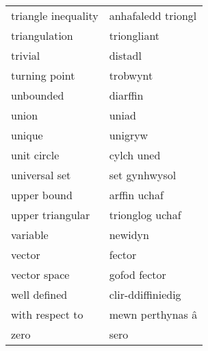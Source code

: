 \begin{supertabular}{p{0.22\textwidth}p{0.22\textwidth}}
              triangle inequality &               anhafaledd triongl \\
                    triangulation &                      triongliant \\
                          trivial &                          distadl \\
                    turning point &                         trobwynt \\
                        unbounded &                         diarffin \\
                            union &                            uniad \\
                           unique &                          unigryw \\
                      unit circle &                       cylch uned \\
                    universal set &                    set gynhwysol \\
                      upper bound &                     arffin uchaf \\
                 upper triangular &                  trionglog uchaf \\
                         variable &                          newidyn \\
                           vector &                           fector \\
                     vector space &                     gofod fector \\
                     well defined &                clir-ddiffiniedig \\
                  with respect to &                 mewn perthynas â \\
                             zero &                             sero \\
\end{supertabular}
